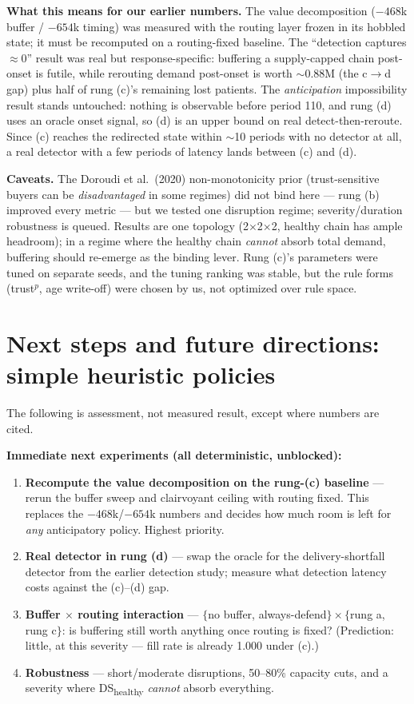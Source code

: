 \documentclass[11pt]{article}
\newcommand{\dsh}{DS\textsubscript{healthy}}
\begin{document}
\textbf{What this means for our earlier numbers.} The value decomposition
($-468$k buffer / $-654$k timing) was measured with the routing layer frozen in its hobbled
state; it must be recomputed on a routing-fixed baseline. The ``detection captures
$\approx$0'' result was real but response-specific: buffering a supply-capped chain
post-onset is futile, while rerouting demand post-onset is worth $\sim$0.88M (the c$\to$d
gap) plus half of rung (c)'s remaining lost patients. The \emph{anticipation} impossibility
result stands untouched: nothing is observable before period 110, and rung (d) uses an
oracle onset signal, so (d) is an upper bound on real detect-then-reroute. Since (c) reaches
the redirected state within $\sim$10 periods with no detector at all, a real detector with a
few periods of latency lands between (c) and (d).

\textbf{Caveats.} The Doroudi et al.\ (2020) non-monotonicity prior (trust-sensitive buyers
can be \emph{disadvantaged} in some regimes) did not bind here --- rung (b) improved every
metric --- but we tested one disruption regime; severity/duration robustness is queued.
Results are one topology (2$\times$2$\times$2, healthy chain has ample headroom); in a regime
where the healthy chain \emph{cannot} absorb total demand, buffering should re-emerge as the
binding lever. Rung (c)'s parameters were tuned on separate seeds, and the tuning ranking was
stable, but the rule forms (trust$^{p}$, age write-off) were chosen by us, not optimized over
rule space.

\section{Next steps and future directions: simple heuristic policies}

The following is assessment, not measured result, except where numbers are cited.

\textbf{Immediate next experiments (all deterministic, unblocked):}
\begin{enumerate}
\item \textbf{Recompute the value decomposition on the rung-(c) baseline} --- rerun the buffer
sweep and clairvoyant ceiling with routing fixed. This replaces the $-468$k/$-654$k numbers
and decides how much room is left for \emph{any} anticipatory policy. Highest priority.
\item \textbf{Real detector in rung (d)} --- swap the oracle for the delivery-shortfall
detector from the earlier detection study; measure what detection latency costs against the
(c)--(d) gap.
\item \textbf{Buffer $\times$ routing interaction} --- $\{$no buffer, always-defend$\}\times
\{$rung a, rung c$\}$: is buffering still worth anything once routing is fixed? (Prediction:
little, at this severity --- fill rate is already 1.000 under (c).)
\item \textbf{Robustness} --- short/moderate disruptions, 50--80\% capacity cuts, and a
severity where \dsh{} \emph{cannot} absorb everything.
\end{enumerate}
\end{document}
